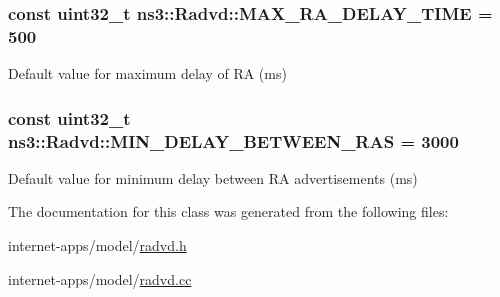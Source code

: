 \subsubsection[{\texorpdfstring{M\+A\+X\+\_\+\+R\+A\+\_\+\+D\+E\+L\+A\+Y\+\_\+\+T\+I\+ME}{MAX_RA_DELAY_TIME}}]{\setlength{\rightskip}{0pt plus 5cm}const uint32\+\_\+t ns3\+::\+Radvd\+::\+M\+A\+X\+\_\+\+R\+A\+\_\+\+D\+E\+L\+A\+Y\+\_\+\+T\+I\+ME = 500\hspace{0.3cm}{\ttfamily [static]}}\hypertarget{classns3_1_1Radvd_a941069848477f9c31c5e0a4e961d2653}{}\label{classns3_1_1Radvd_a941069848477f9c31c5e0a4e961d2653}


Default value for maximum delay of RA (ms) 

\subsubsection[{\texorpdfstring{M\+I\+N\+\_\+\+D\+E\+L\+A\+Y\+\_\+\+B\+E\+T\+W\+E\+E\+N\+\_\+\+R\+AS}{MIN_DELAY_BETWEEN_RAS}}]{\setlength{\rightskip}{0pt plus 5cm}const uint32\+\_\+t ns3\+::\+Radvd\+::\+M\+I\+N\+\_\+\+D\+E\+L\+A\+Y\+\_\+\+B\+E\+T\+W\+E\+E\+N\+\_\+\+R\+AS = 3000\hspace{0.3cm}{\ttfamily [static]}}\hypertarget{classns3_1_1Radvd_a9a4a728aa868bc0e5b5cf692fa235642}{}\label{classns3_1_1Radvd_a9a4a728aa868bc0e5b5cf692fa235642}


Default value for minimum delay between RA advertisements (ms) 



The documentation for this class was generated from the following files\+:\begin{DoxyCompactItemize}
\item 
internet-\/apps/model/\hyperlink{radvd_8h}{radvd.\+h}\item 
internet-\/apps/model/\hyperlink{radvd_8cc}{radvd.\+cc}\end{DoxyCompactItemize}
